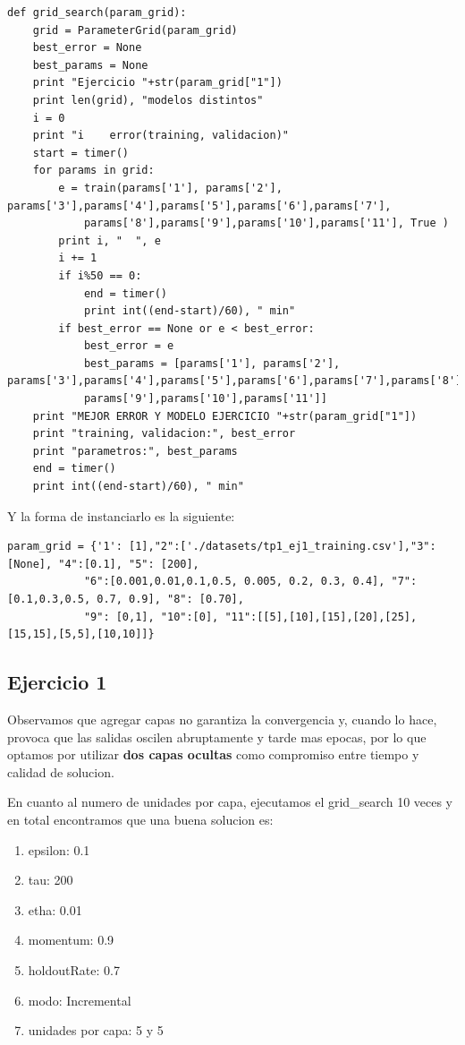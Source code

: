 \begin{lstlisting}[caption=grid\_search]
def grid_search(param_grid):
	grid = ParameterGrid(param_grid)
	best_error = None
	best_params = None
	print "Ejercicio "+str(param_grid["1"])
	print len(grid), "modelos distintos"
	i = 0
	print "i 	error(training, validacion)"
	start = timer()
	for params in grid:
	    e = train(params['1'], params['2'], params['3'],params['4'],params['5'],params['6'],params['7'],
	    	params['8'],params['9'],params['10'],params['11'], True )
	    print i, "	", e
	    i += 1
	    if i%50 == 0:
	    	end = timer()
	    	print int((end-start)/60), " min"
	    if best_error == None or e < best_error:
	    	best_error = e
	    	best_params = [params['1'], params['2'], params['3'],params['4'],params['5'],params['6'],params['7'],params['8'],
	    	params['9'],params['10'],params['11']]
	print "MEJOR ERROR Y MODELO EJERCICIO "+str(param_grid["1"])
	print "training, validacion:", best_error
	print "parametros:", best_params
	end = timer()
	print int((end-start)/60), " min"
\end{lstlisting}

Y la forma de instanciarlo es la siguiente:

\begin{lstlisting}[caption=Instanciacion]
param_grid = {'1': [1],"2":['./datasets/tp1_ej1_training.csv'],"3": [None], "4":[0.1], "5": [200], 
			"6":[0.001,0.01,0.1,0.5, 0.005, 0.2, 0.3, 0.4], "7":[0.1,0.3,0.5, 0.7, 0.9], "8": [0.70], 
			"9": [0,1], "10":[0], "11":[[5],[10],[15],[20],[25],[15,15],[5,5],[10,10]]}
\end{lstlisting}


\subsection{Ejercicio 1}

Observamos que agregar capas no garantiza la convergencia y, cuando lo hace, provoca que las salidas oscilen abruptamente y tarde mas epocas, por lo que optamos por utilizar \textbf{dos capas ocultas} como compromiso entre tiempo y calidad de solucion. 


En cuanto al numero de unidades por capa, ejecutamos el grid\_search 10 veces y en total encontramos que una buena solucion es:

\begin{enumerate}
\item epsilon: 0.1
\item tau: 200
\item etha: 0.01
\item momentum: 0.9
\item holdoutRate: 0.7
\item modo: Incremental
\item unidades por capa: 5 y 5
\end{enumerate}

